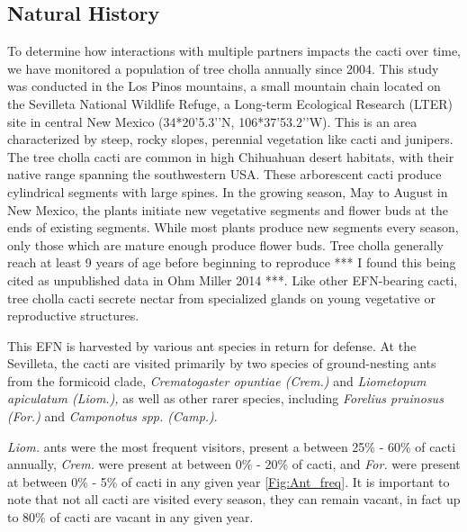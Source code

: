 \documentclass[12pt,a4paper]{article}
\begin{document}
\subsection*{Natural History}
To determine how interactions with multiple partners impacts the cacti over time, we have monitored a population of tree cholla annually since 2004. 
This study was conducted in the Los Pinos mountains, a small mountain chain located on the Sevilleta National Wildlife Refuge, a Long-term Ecological Research (LTER) site in central New Mexico (34*20’5.3’’N, 106*37’53.2’’W).
This is an area characterized by steep, rocky slopes, perennial vegetation like cacti and junipers. 
The tree cholla cacti are common in high Chihuahuan desert habitats, with their native range spanning the southwestern USA\cite{Benson1982}. 
These arborescent cacti produce cylindrical segments with large spines. 
In the growing season, May to August in New Mexico, the plants initiate new vegetative segments and flower buds at the ends of existing segments. 
While most plants produce new segments every season, only those which are mature enough produce flower buds. 
Tree cholla generally reach at least 9 years of age before beginning to reproduce *** I found this being cited as unpublished data in Ohm Miller 2014 ***. 
Like other EFN-bearing cacti, tree cholla cacti secrete nectar from specialized glands on young vegetative or reproductive structures\cite{Ness2006,Oliveira1999}.

This EFN is harvested by various ant species in return for defense. 
At the Sevilleta, the cacti are visited primarily by two species of ground-nesting ants from the formicoid clade, \textit{Crematogaster opuntiae (Crem.) } and \textit{Liometopum apiculatum (Liom.), } as well as other rarer species, including \textit{Forelius pruinosus (For.) } and \textit{Camponotus spp. (Camp.)}.
 
\textit{Liom.} ants were the most frequent visitors, present a  between 25\% - 60\% of cacti annually, \textit{Crem.} were present at between 0\% - 20\% of cacti, and \textit{For.} were present at between 0\% - 5\% of cacti in any given year \ref{Fig:Ant_freq}. 
It is important to note that not all cacti are visited every season, they can remain vacant, in fact up to 80\% of cacti are vacant in any given year. 
\end{document}
